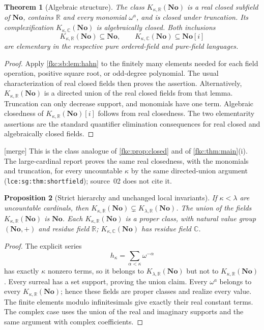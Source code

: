 \documentclass[11pt,letterpaper]{article}
\numberwithin{equation}{section}
\newtheorem{theorem}{Theorem}[section]
\newtheorem{proposition}[theorem]{Proposition}
\theoremstyle{definition}
\theoremstyle{remark}
\newcommand{\R}{\mathbb R}
\newcommand{\C}{\mathbb C}
\newcommand{\No}{\mathbf{No}}
\newcommand{\mergetag}{\textup{\textsf{\small[merge]}}}%
\newcommand{\SC}{\mathbf{No}[i]}
\newcommand{\KN}[2]{K_{#1,#2}(\No)}%
\newcommand{\lbl}[1]{\nolinkurl{#1}}%
\begin{document}
\begin{theorem}[Algebraic structure]\label{fkc:sb:thm:fields}
The class $\KN\kappa\R$ is a real closed subfield of $\No$, contains $\R$ and every monomial $\omega^a$, and is closed under truncation. Its complexification $\KN\kappa\C$ is algebraically closed. Both inclusions
\[
 \KN\kappa\R\subseteq\No,\qquad \KN\kappa\C\subseteq\SC
\]
are elementary in the respective pure ordered-field and pure-field languages.
\end{theorem}
\begin{proof}
Apply \cref{fkc:sb:lem:hahn} to the finitely many elements needed for each field operation, positive square root, or odd-degree polynomial. The usual characterization of real closed fields then proves the assertion. Alternatively, $\KN\kappa\R$ is a directed union of the real closed fields from that lemma. Truncation can only decrease support, and monomials have one term. Algebraic closedness of $\KN\kappa\R[i]$ follows from real closedness. The two elementarity assertions are the standard quantifier elimination consequences for real closed and algebraically closed fields.
\end{proof}
\mergetag{} This is the class analogue of \cref{fkc:prop:closed} and of \cref{fkc:thm:main}(i). The large-cardinal report proves the same real closedness, with the monomials and truncation, for every uncountable $\kappa$ by the same directed-union argument (\lbl{lce:sg:thm:shortfield}); source~02 does not cite it.

\begin{proposition}[Strict hierarchy and unchanged local invariants]\label{fkc:sb:prop:hierarchy}
If $\kappa<\lambda$ are uncountable cardinals, then $\KN\kappa\R\subsetneq\KN\lambda\R$. The union of the fields $\KN\kappa\R$ is $\No$. Each $\KN\kappa\R$ is a proper class, with natural value group $(\No,+)$ and residue field $\R$; $\KN\kappa\C$ has residue field $\C$.
\end{proposition}
\begin{proof}
The explicit series
\begin{equation}\label{fkc:sb:eq:hkappa}
 h_\kappa=\sum_{\alpha<\kappa}\omega^{-\alpha}
\end{equation}
has exactly $\kappa$ nonzero terms, so it belongs to $\KN\lambda\R$ but not to $\KN\kappa\R$. Every surreal has a set support, proving the union claim. Every $\omega^a$ belongs to every $\KN\kappa\R$; hence these fields are proper classes and realize every value. The finite elements modulo infinitesimals give exactly their real constant terms. The complex case uses the union of the real and imaginary supports and the same argument with complex coefficients.
\end{proof}
\end{document}
